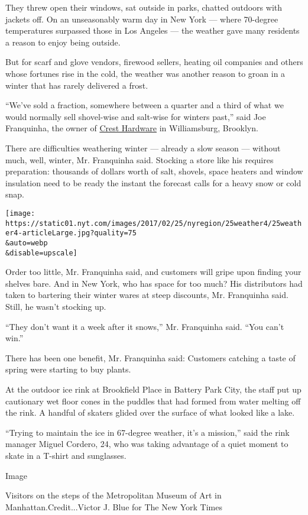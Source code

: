 They threw open their windows, sat outside in parks, chatted outdoors
with jackets off. On an unseasonably warm day in New York --- where
70-degree temperatures surpassed those in Los Angeles --- the weather
gave many residents a reason to enjoy being outside.

But for scarf and glove vendors, firewood sellers, heating oil companies
and others whose fortunes rise in the cold, the weather was another
reason to groan in a winter that has rarely delivered a frost.

``We've sold a fraction, somewhere between a quarter and a third of what
we would normally sell shovel-wise and salt-wise for winters past,''
said Joe Franquinha, the owner of
\href{http://www.cresthardwarenyc.com/}{Crest Hardware} in Williamsburg,
Brooklyn.

There are difficulties weathering winter --- already a slow season ---
without much, well, winter, Mr. Franquinha said. Stocking a store like
his requires preparation: thousands of dollars worth of salt, shovels,
space heaters and window insulation need to be ready the instant the
forecast calls for a heavy snow or cold snap.

\texttt{[image: https://static01.nyt.com/images/2017/02/25/nyregion/25weather4/25weather4-articleLarge.jpg?quality=75\\\&auto=webp\\\&disable=upscale]}

Order too little, Mr. Franquinha said, and customers will gripe upon
finding your shelves bare. And in New York, who has space for too much?
His distributors had taken to bartering their winter wares at steep
discounts, Mr. Franquinha said. Still, he wasn't stocking up.

``They don't want it a week after it snows,'' Mr. Franquinha said. ``You
can't win.''

There has been one benefit, Mr. Franquinha said: Customers catching a
taste of spring were starting to buy plants.

At the outdoor ice rink at Brookfield Place in Battery Park City, the
staff put up cautionary wet floor cones in the puddles that had formed
from water melting off the rink. A handful of skaters glided over the
surface of what looked like a lake.

``Trying to maintain the ice in 67-degree weather, it's a mission,''
said the rink manager Miguel Cordero, 24, who was taking advantage of a
quiet moment to skate in a T-shirt and sunglasses.

Image

Visitors on the steps of the Metropolitan Museum of Art in
Manhattan.Credit...Victor J. Blue for The New York Times

